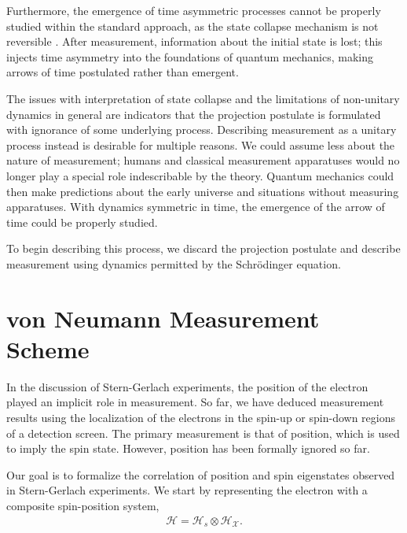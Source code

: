 Furthermore, the emergence of time asymmetric processes cannot be properly studied within the standard approach, as the state collapse mechanism is not reversible \cite{mann}. After measurement, information about the initial state is lost; this injects time asymmetry into the foundations of quantum mechanics, making arrows of time postulated rather than emergent.

The issues with interpretation of state collapse and the limitations of non-unitary dynamics in general are indicators that the projection postulate is formulated with ignorance of some underlying process. Describing measurement as a unitary process instead is desirable for multiple reasons. We could assume less about the nature of measurement; humans and classical measurement apparatuses would no longer play a special role indescribable by the theory. Quantum mechanics could then make predictions about the early universe and situations without measuring apparatuses. With dynamics symmetric in time, the emergence of the arrow of time could be properly studied.

To begin describing this process, we discard the projection postulate and describe measurement using dynamics permitted by the Schrödinger equation.
%

\section{von Neumann Measurement Scheme} \label{vnms}
In the discussion of Stern-Gerlach experiments, the position of the electron played an implicit role in measurement. So far, we have deduced measurement results using the localization of the electrons in the spin-up or spin-down regions of a detection screen. The primary measurement is that of position, which is used to imply the spin state. However, position has been formally ignored so far.

Our goal is to formalize the correlation of position and spin eigenstates observed in Stern-Gerlach experiments. We start by representing the electron with a composite spin-position system,
\begin{align}
  \mathcal{H} = \mathcal{H}_s \otimes \mathcal{H}_\mathcal{X}.
\end{align}

